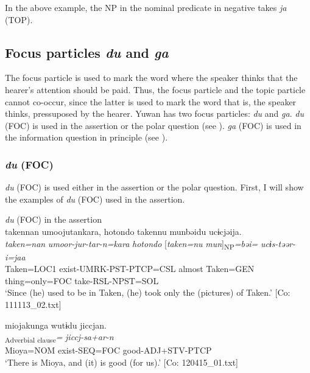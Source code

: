 In the above example, the NP in the nominal predicate in negative takes \textit{ja} (TOP).

\subsection{Focus particles \textit{du} and \textit{ga}}\label{sec:10.1.2}

The focus particle is used to mark the word where the speaker thinks that the hearer’s attention should be paid. Thus, the focus particle and the topic particle cannot co-occur, since the latter is used to mark the word that is, the speaker thinks, pressuposed by the hearer. Yuwan has two focus particles: \textit{du} and \textit{ga}. \textit{du} (FOC) is used in the assertion or the polar question (see ). \textit{ga} (FOC) is used in the information question in principle (see ).

\subsubsection{\textit{du} (FOC)}\label{sec:10.1.2.1}

\textit{du} (FOC) is used either in the assertion or the polar question. First, I will show the examples of \textit{du} (FOC) used in the assertion.

\ea\label{ex:10.9}   \textit{du} (FOC) in the assertion\\
  \ea  %
      \glll    takennan  umoojutankara,  {\textbar}hotondo{\textbar}  takennu   munbəidu  ucɨcjəija.\\
      \textit{taken=nan}  \textit{umoor-jur-tar-n=kara}  \textit{hotondo}  [\textit{taken=nu} \textit{mun}]\textsubscript{NP}\textit{=bəi=}  \textit{ucɨs-təər-i=jaa}\\
      Taken=LOC1  exist-UMRK-PST-PTCP=CSL  almost  Taken=GEN   thing=only=FOC  take-RSL-NPST=SOL\\
      \glt       ‘Since (he) used to be in Taken, (he) took only the (pictures) of Taken.’ [Co: 111113\_02.txt]

  \ex  %
      \glll    miojakunga  wutɨdu  jiccjan.\\
      [\textit{miojakun=ga}  \textit{wur-tɨ}]\textsubscript{Adverbial clause}\textit{=}  \textit{jiccj-sa+ar-n}\\
      Mioya=NOM  exist-SEQ=FOC  good-ADJ+STV-PTCP\\
      \glt       ‘There is Mioya, and (it) is good (for us).’ [Co: 120415\_01.txt]

